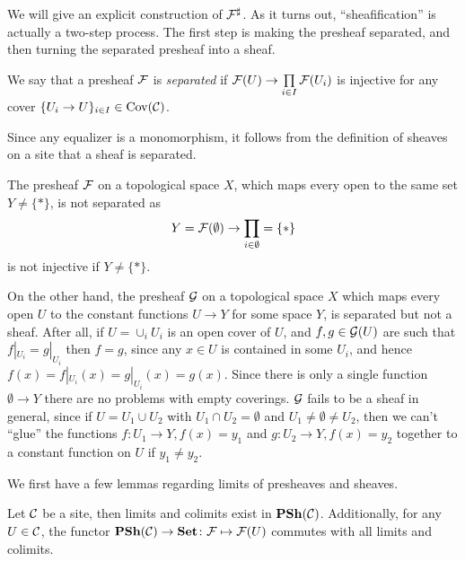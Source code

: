 \documentclass{article}
\DeclareMathOperator{\Cov}{Cov}
\begin{document}
We will give an explicit construction of $\mathcal{F}^\sharp$.
As it turns out, ``sheafification'' is actually a two-step process.
The first step is making the presheaf separated, and then turning
the separated presheaf into a sheaf.
\begin{definition}
    We say that a presheaf $\mathcal{F}$ is \emph{separated} if
    $\mathcal{F}(U) \to \prod\limits_{i\in I} \mathcal{F}(U_i)$ is injective
    for any cover $\{U_i \to U\}_{i\in I} \in \Cov(\mcC)$.
\end{definition}
\begin{remark}
    Since any equalizer is a monomorphism, it follows from the definition
    of sheaves on a site that a sheaf is separated.
\end{remark}
\begin{example}
    \label{exmp:bad_presheaves}
    The presheaf $\mathcal{F}$ on a topological space $X$, which maps every
    open to the same set $Y \neq \{*\}$, is not separated as
    \begin{equation*}
        Y = \mathcal{F}(\emptyset) \to \prod_{i \in \emptyset} = \{*\}
    \end{equation*}
    is not injective if $Y \neq \{*\}$.

    On the other hand, the presheaf $\mathcal{G}$ on a topological space
    $X$ which maps every open $U$ to the constant functions $U \to Y$
    for some space $Y$, is separated but not a sheaf. After all,
    if $U = \cup_i U_i$ is an open cover of $U$, and $f,g \in \mathcal{G}(U)$
    are such that $f|_{U_i} = g|_{U_i}$ then $f = g$, since any $x\in U$
    is contained in some $U_i$, and hence $f(x) = f|_{U_i}(x) = g|_{U_i}(x) = g(x)$.
    Since there is only a single function $\emptyset \to Y$ there are no
    problems with empty coverings. $\mathcal{G}$ fails to be a sheaf
    in general, since if $U = U_1 \cup U_2$ with $U_1 \cap U_2 = \emptyset$
    and $U_1 \neq \emptyset \neq U_2$, then we can't ``glue'' the functions
    $f \colon U_1 \to Y, f(x) = y_1$ and $g\colon U_2 \to Y, f(x) =y_2$
    together to a constant function on $U$ if $y_1 \neq y_2$.
\end{example}
We first have a few lemmas regarding limits of presheaves and sheaves.
\begin{lemma}
    \label{lem:lims_colims_presheaves}
    Let $\mathcal{C}$ be a site, then limits and
    colimits exist in $\operatorname{\mathbf{PSh}}(\mathcal{C})$. Additionally, for any $U\in \mathcal{C}$,
    the functor $\operatorname{\mathbf{PSh}}(\mathcal{C}) \to \operatorname{\mathbf{Set}} \colon \mathcal{F} \mapsto \mathcal{F}(U)$
    commutes with all limits and colimits.
\end{lemma}
\end{document}
